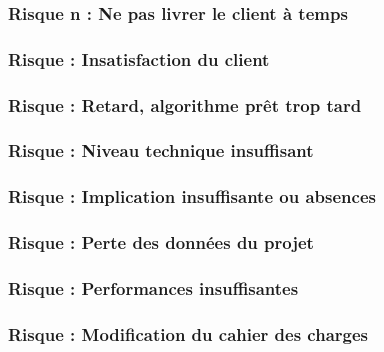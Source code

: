 \documentclass[a4paper,11pt,french]{article}
\begin{document}
\subsubsection{Risque n  : Ne pas livrer le client à temps}


\newpage
\subsubsection{Risque  : Insatisfaction du client}


\newpage
\subsubsection{Risque  : Retard, algorithme prêt trop tard}


\newpage
\subsubsection{Risque  : Niveau technique insuffisant}


\newpage
\subsubsection{Risque  : Implication insuffisante ou absences}


\newpage
\subsubsection{Risque  : Perte des données du projet }


\newpage
\subsubsection{Risque  : Performances insuffisantes }


\newpage
\subsubsection{Risque  : Modification du cahier des charges}

\end{document}
